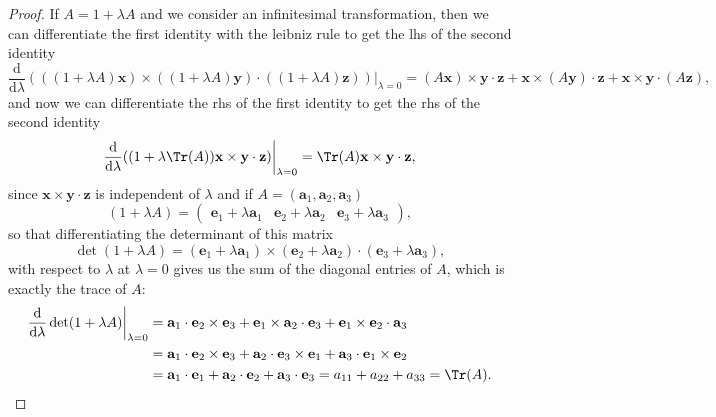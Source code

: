 \begin{proof}
    If \(A = 1 + \lambda A\) and we consider an infinitesimal transformation, then we can differentiate the first identity with the leibniz rule to get the lhs of the second identity
    \[
        \frac{\mathrm{d}}{\mathrm{d} \lambda} (((1+\lambda A) \mathbf{x}) \times ((1 + \lambda A) \mathbf{y}) \cdot ((1+\lambda A) \mathbf{z})) \bigg|_{\lambda = 0} = (A \mathbf{x}) \times \mathbf{y} \cdot \mathbf{z} + \mathbf{x} \times (A \mathbf{y}) \cdot \mathbf{z} + \mathbf{x} \times \mathbf{y} \cdot (A \mathbf{z}),
    \]
    and now we can differentiate the rhs of the first identity to get the rhs of the second identity
    \[
        \frac{\mathrm{d}}{\mathrm{d} \lambda} ((1 + \lambda \Tr(A)) \mathbf{x} \times \mathbf{y} \cdot \mathbf{z}) \bigg|_{\lambda = 0} = \Tr(A) \mathbf{x} \times \mathbf{y} \cdot \mathbf{z},
    \]
    since \(\mathbf{x} \times \mathbf{y} \cdot \mathbf{z}\) is independent of \(\lambda\) and if \(A = (\mathbf{a}_1, \mathbf{a}_2, \mathbf{a}_3)\)
    \[
        (1+\lambda A) = \begin{pmatrix}
            \mathbf{e}_1 + \lambda \mathbf{a}_1 & \mathbf{e}_2 + \lambda \mathbf{a}_2 & \mathbf{e}_3 + \lambda \mathbf{a}_3
        \end{pmatrix},
    \]
    so that differentiating the determinant of this matrix
    \[
        \det(1 + \lambda A) = (\mathbf{e}_1 + \lambda \mathbf{a}_1) \times (\mathbf{e}_2 + \lambda \mathbf{a}_2) \cdot (\mathbf{e}_3 + \lambda \mathbf{a}_3),
    \]
    with respect to \(\lambda\) at \(\lambda = 0\) gives us the sum of the diagonal entries of \(A\), which is exactly the trace of \(A\):
    \[
        \begin{aligned}
            \frac{\mathrm{d}}{\mathrm{d} \lambda} \det(1 + \lambda A) \bigg|_{\lambda = 0} & = \mathbf{a}_1 \cdot \mathbf{e}_2 \times \mathbf{e}_3 + \mathbf{e}_1 \times \mathbf{a}_2 \cdot \mathbf{e}_3 + \mathbf{e}_1 \times \mathbf{e}_2 \cdot \mathbf{a}_3 \\
                                                                                           & = \mathbf{a}_1 \cdot \mathbf{e}_2 \times \mathbf{e}_3 + \mathbf{a}_2 \cdot \mathbf{e}_3 \times \mathbf{e}_1 + \mathbf{a}_3 \cdot \mathbf{e}_1 \times \mathbf{e}_2 \\
                                                                                           & = \mathbf{a}_1 \cdot \mathbf{e}_1 + \mathbf{a}_2 \cdot \mathbf{e}_2 + \mathbf{a}_3 \cdot \mathbf{e}_3 = a_{11} + a_{22} + a_{33} = \Tr(A).
        \end{aligned}
    \]
\end{proof}

